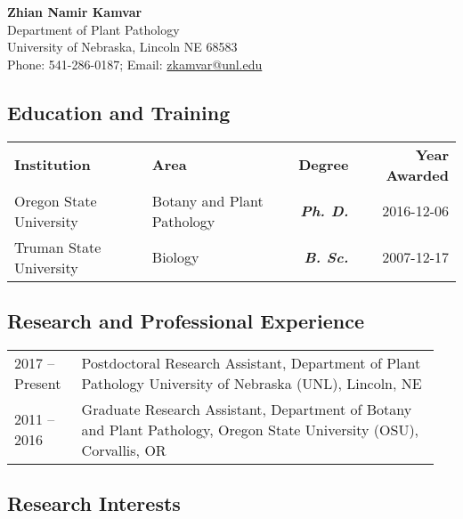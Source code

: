 \documentclass[12pt,letterpaper]{article}
\title{\ruleline{Biographical Sketch}}
\begin{document}
\maketitle

\begin{center}
{\bf Zhian Namir Kamvar}\\
Department of Plant Pathology \\
University of Nebraska, Lincoln NE 68583\\
Phone: 541-286-0187; Email: \href{mailto:zkamvar@unl.edu}{zkamvar@unl.edu}
\end{center}

\subsection*{Education and Training}  

\begin{center}
\begin{tabular}{llrr}%
\textbf{Institution} & \textbf{Area} & \textbf{Degree} & \textbf{Year Awarded}\\
Oregon State University & Botany and Plant Pathology & \textit{\textbf{Ph. D.}} & 2016-12-06\\
Truman State University & Biology  & \textit{\textbf{B. Sc.}} &  2007-12-17
\end{tabular}
\end{center}



\subsection*{Research and Professional Experience}

\begin{tabular}{p{0.15\linewidth}p{0.8\linewidth}}
2017 --	Present & Postdoctoral Research Assistant, Department of Plant Pathology 
			      University of Nebraska (UNL), Lincoln, NE\\
2011 -- 2016    & Graduate Research Assistant, Department of Botany and Plant 
                  Pathology, Oregon State University (OSU), Corvallis, OR
\end{tabular}

\subsection*{Research Interests}
\end{document}
